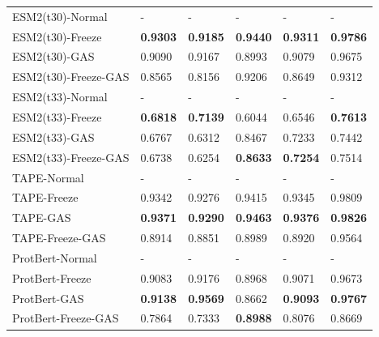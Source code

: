 \begin{table}[h]
\begin{tabular}{llllll}
		
		ESM2(t30)-Normal            & -                 & -                  & -               & -                 & -               %
		\\
		ESM2(t30)-Freeze     & \textbf{0.9303}   & \textbf{0.9185}    & \textbf{0.9440} & \textbf{0.9311}   & \textbf{0.9786} %
		\\
		ESM2(t30)-GAS        & 0.9090            & 0.9167             & 0.8993          & 0.9079            & 0.9675          %
		\\
		ESM2(t30)-Freeze-GAS & 0.8565            & 0.8156             & 0.9206          & 0.8649            & 0.9312          %
		\\ \hline
		
		
		ESM2(t33)-Normal            & -                 & -                  & -               & -                 & -               %
		\\
		ESM2(t33)-Freeze     & \textbf{0.6818}   & \textbf{0.7139}    & 0.6044          & 0.6546            & \textbf{0.7613} %
		\\
		ESM2(t33)-GAS        & 0.6767            & 0.6312             & 0.8467          & 0.7233            & 0.7442         %
		\\
		ESM2(t33)-Freeze-GAS & 0.6738            & 0.6254             & \textbf{0.8633} & \textbf{0.7254}   & 0.7514          %
		\\ \hline
		
		
		TAPE-Normal                 & -                 & -                  & -               & -                 & -               %
		\\
		TAPE-Freeze          & 0.9342            & 0.9276             & 0.9415          & 0.9345            & 0.9809          %
		\\
		TAPE-GAS             & \textbf{0.9371}   & \textbf{0.9290}    & \textbf{0.9463} & \textbf{0.9376}   & \textbf{0.9826} %
		\\
		TAPE-Freeze-GAS      & 0.8914            & 0.8851             & 0.8989          & 0.8920            & 0.9564          %
		\\ \hline
		
		
		ProtBert-Normal             & -                 & -                  & -               & -                 & -               %
		\\
		ProtBert-Freeze      & 0.9083            & 0.9176             & 0.8968          & 0.9071            & 0.9673          %
		\\
		ProtBert-GAS         & \textbf{0.9138}   & \textbf{0.9569}    & 0.8662          & \textbf{0.9093}   & \textbf{0.9767} %
		\\
		ProtBert-Freeze-GAS  & 0.7864            & 0.7333             & \textbf{0.8988} & 0.8076            & 0.8669          %
		\\ \hline
	\end{tabular}
\end{table}
